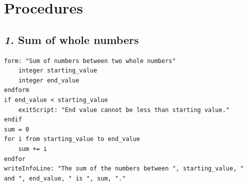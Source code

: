 \documentclass[12pt, english]{article}
\newcommand{\mysection}[2]{\setcounter{section}{#1}\addtocounter{section}{-1}\section{#2}}
\begin{document}

\mysection{3}{Procedures}
\vspace{10pt}

\subsection*{\emph{1.} Sum of whole numbers} 

\begin{lstlisting}
form: "Sum of numbers between two whole numbers"
	integer starting_value
	integer end_value
endform
if end_value < starting_value
	exitScript: "End value cannot be less than starting value."
endif
sum = 0
for i from starting_value to end_value
    sum += i
endfor
writeInfoLine: "The sum of the numbers between ", starting_value, " and ", end_value, " is ", sum, "."
\end{lstlisting}


\vspace{10pt}

\end{document}
